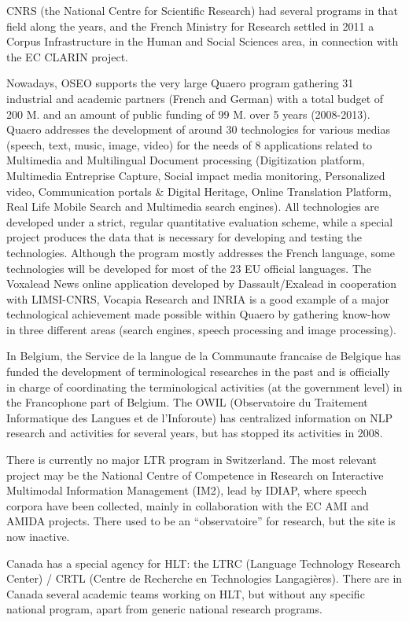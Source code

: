 \documentclass[10pt, plain]{../../metanetpaper}
\begin{document}
\begin{multicols}{2}
\begin{small}
CNRS (the National Centre for Scientific Research) had several programs in that field along the years, and the French Ministry for Research settled in 2011 a Corpus Infrastructure in the Human and Social Sciences area, in connection with the EC CLARIN project.

Nowadays, OSEO supports the very large Quaero program gathering 31 industrial and academic partners (French and German) with a total budget of 200 M. and an amount of public funding of 99 M. over 5 years (2008-2013). Quaero addresses the development of around 30 technologies for various medias (speech, text, music, image, video) for the needs of 8 applications related to Multimedia and Multilingual Document processing (Digitization platform, Multimedia Entreprise Capture, Social impact media monitoring, Personalized video, Communication portals \& Digital Heritage, Online Translation Platform, Real Life Mobile Search and Multimedia search engines). All technologies are developed under a strict, regular quantitative evaluation scheme, while a special project produces the data that is necessary for developing and testing the technologies. Although the program mostly addresses the French language, some technologies will be developed for most of the 23 EU official languages. The Voxalead News online application developed by Dassault/Exalead in cooperation with LIMSI-CNRS, Vocapia Research and INRIA is a good example of a major technological achievement made possible within Quaero by gathering know-how in three different areas (search engines, speech processing and image processing). 

In Belgium, the Service de la langue de la Communaute francaise de Belgique has funded the development of terminological researches in the past and is officially in charge of coordinating the terminological activities (at the government level) in the Francophone part of Belgium. The OWIL (Observatoire du Traitement Informatique des Langues et de l’Inforoute) has centralized information on NLP research and activities for several years, but has stopped its activities in 2008.

There is currently no major LTR program in Switzerland.  The most relevant project may be the National Centre of Competence in Research on Interactive Multimodal Information Management (IM2), lead by IDIAP, where speech corpora have been collected, mainly in collaboration with the EC AMI and AMIDA projects. There used to be an “observatoire” for research, but the site is now inactive. 

Canada has a special agency for HLT: the LTRC (Language Technology Research Center) / CRTL (Centre de Recherche en Technologies Langagières). There are in Canada several academic teams working on HLT, but without any specific national program, apart from generic national research programs.


\end{small}
\end{multicols}
\end{document}
